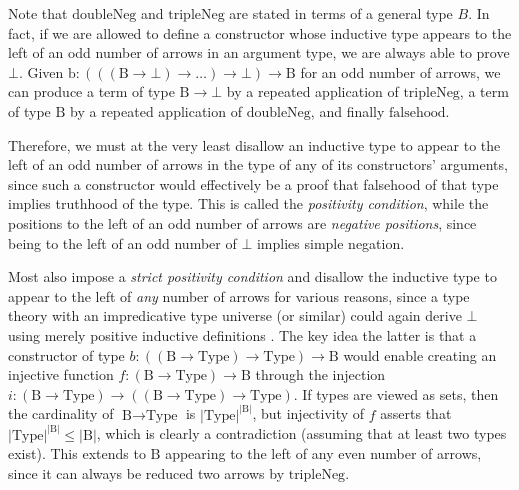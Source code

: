 \documentclass{report}
\newcommand{\const}[1]{\text{#1}}
\newcommand{\Type}{\const{Type}}
\begin{document}
Note that $\const{doubleNeg}$ and $\const{tripleNeg}$ are stated in terms of a general type $B$. In fact, if we are allowed to define a constructor whose inductive type appears to the left of an odd number of arrows in an argument type, we are always able to prove $\bot$. Given $\const{b}: (((\const{B} \to \bot) \to \dots) \to \bot) \to \const{B}$ for an odd number of arrows, we can produce a term of type $\const{B} \to \bot$ by a repeated application of $\const{tripleNeg}$, a term of type $\const{B}$ by a repeated application of $\const{doubleNeg}$, and finally $\const{falsehood}$.

Therefore, we must at the very least disallow an inductive type to appear to the left of an odd number of arrows in the type of any of its constructors' arguments, since such a constructor would effectively be a proof that falsehood of that type implies truthhood of the type. This is called the \emph{positivity condition}, while the positions to the left of an odd number of arrows are \emph{negative positions}, since being to the left of an odd number of $\bot$ implies simple negation.

Most also impose a \emph{strict positivity condition} and disallow the inductive type to appear to the left of \emph{any} number of arrows for various reasons, since a type theory with an impredicative \const{Prop} type universe (or similar) could again derive $\bot$ using merely positive inductive definitions \citep{strict-pos}. The key idea the latter is that a constructor of type $b: ((\const{B} \to \Type) \to \Type) \to \const{B}$ would enable creating an injective function $f: (\const{B} \to \Type) \to \const{B}$ through the injection $i: (\const{B} \to \Type) \to ((\const{B} \to \Type) \to \Type)$. If types are viewed as sets, then the cardinality of $\const{B} \to \Type$ is $|\Type|^{|\const{B}|}$, but injectivity of $f$ asserts that $|\Type|^{|\const{B}|} \leq |\const{B}|$, which is clearly a contradiction (assuming that at least two types exist). This extends to $\const{B}$ appearing to the left of any even number of arrows, since it can always be reduced two arrows by $\const{tripleNeg}$.

\end{document}
